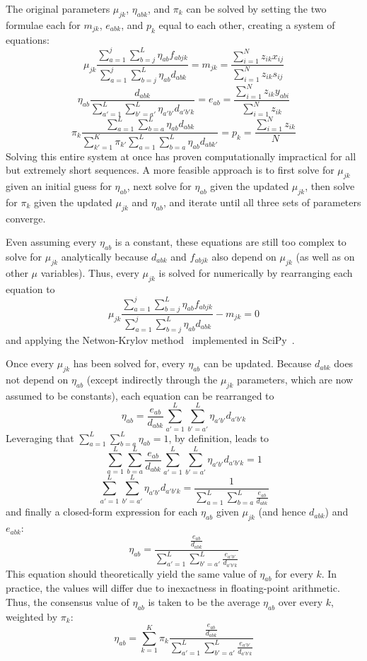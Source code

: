 \documentclass[../../MainTexts/main.tex]{subfiles}
\begin{document}
The original parameters $\mu_{jk}$, $\eta_{abk}$, and $\pi_k$ can be solved by setting the two formulae each for $m_{jk}$, $e_{abk}$, and $p_k$ equal to each other, creating a system of equations:
$$\mu_{jk} \frac{\sum_{a=1}^{j}\sum_{b=j}^{L}\eta_{ab} f_{abjk}}{\sum_{a=1}^{j}\sum_{b=j}^{L}\eta_{ab}d_{abk}} = m_{jk} = \frac{\sum_{i=1}^{N} z_{ik} x_{ij}}{\sum_{i=1}^{N} z_{ik} s_{ij}}$$
$$\eta_{ab} \frac{d_{abk}}{\sum_{a'=1}^{L} \sum_{b'=a'}^{L} \eta_{a'b'} d_{a'b'k}} = e_{ab} = \frac{\sum_{i=1}^{N} z_{ik} y_{abi}}{\sum_{i=1}^{N} z_{ik}}$$
$$\pi_k \frac{\sum_{a=1}^{L} \sum_{b=a}^{L} \eta_{ab} d_{abk}}{\sum_{k'=1}^{K} \pi_{k'} \sum_{a=1}^{L} \sum_{b=a}^{L} \eta_{ab} d_{abk'}} = p_k = \frac{\sum_{i=1}^{N} z_{ik}}{N}$$
Solving this entire system at once has proven computationally impractical for all but extremely short sequences.
A more feasible approach is to first solve for $\mu_{jk}$ given an initial guess for $\eta_{ab}$, next solve for $\eta_{ab}$ given the updated $\mu_{jk}$, then solve for $\pi_k$ given the updated $\mu_{jk}$ and $\eta_{ab}$, and iterate until all three sets of parameters converge.

Even assuming every $\eta_{ab}$ is a constant, these equations are still too complex to solve for $\mu_{jk}$ analytically because $d_{abk}$ and $f_{abjk}$ also depend on $\mu_{jk}$ (as well as on other $\mu$ variables).
Thus, every $\mu_{jk}$ is solved for numerically by rearranging each equation to
$$\mu_{jk} \frac{\sum_{a=1}^{j}\sum_{b=j}^{L}\eta_{ab} f_{abjk}}{\sum_{a=1}^{j}\sum_{b=j}^{L}\eta_{ab}d_{abk}} - m_{jk} = 0$$
and applying the Netwon-Krylov method~\cite{Knoll2004} implemented in SciPy~\cite{Virtanen2020}.

Once every $\mu_{jk}$ has been solved for, every $\eta_{ab}$ can be updated.
Because $d_{abk}$ does not depend on $\eta_{ab}$ (except indirectly through the $\mu_{jk}$ parameters, which are now assumed to be constants), each equation can be rearranged to
$$\eta_{ab} = \frac{e_{ab}}{d_{abk}} \sum_{a'=1}^{L} \sum_{b'=a'}^{L} \eta_{a'b'} d_{a'b'k}$$
Leveraging that $\sum_{a=1}^{L} \sum_{b=a}^{L} \eta_{ab} = 1$, by definition, leads to
$$\sum_{a=1}^{L} \sum_{b=a}^{L} \frac{e_{ab}}{d_{abk}} \sum_{a'=1}^{L} \sum_{b'=a'}^{L} \eta_{a'b'} d_{a'b'k} = 1$$
$$\sum_{a'=1}^{L} \sum_{b'=a'}^{L} \eta_{a'b'} d_{a'b'k} = \frac{1}{\sum_{a=1}^{L} \sum_{b=a}^{L} \frac{e_{ab}}{d_{abk}}}$$
and finally a closed-form expression for each $\eta_{ab}$ given $\mu_{jk}$ (and hence $d_{abk}$) and $e_{abk}$:
$$\eta_{ab} = \frac{\frac{e_{ab}}{d_{abk}}}{\sum_{a'=1}^{L} \sum_{b'=a'}^{L} \frac{e_{a'b'}}{d_{a'b'k}}}$$
This equation should theoretically yield the same value of $\eta_{ab}$ for every $k$.
In practice, the values will differ due to inexactness in floating-point arithmetic.
Thus, the consensus value of $\eta_{ab}$ is taken to be the average $\eta_{ab}$ over every $k$, weighted by $\pi_k$:
$$\eta_{ab} = \sum_{k=1}^{K} \pi_k \frac{\frac{e_{ab}}{d_{abk}}}{\sum_{a'=1}^{L} \sum_{b'=a'}^{L} \frac{e_{a'b'}}{d_{a'b'k}}}$$
\end{document}
